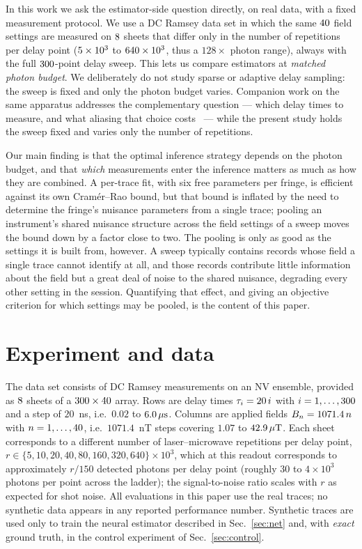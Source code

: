 \documentclass[aps,pra,twocolumn,superscriptaddress,nofootinbib]{revtex4-2}
\newcommand{\mus}{\,\mu\mathrm{s}}
\newcommand{\muT}{\,\mu\mathrm{T}}
\begin{document}
In this work we ask the estimator-side question directly, on real data, with a fixed
measurement protocol. We use a DC Ramsey data set in which the same $40$ field
settings are measured on $8$ sheets that differ only in the number of repetitions
per delay point ($5\times10^{3}$ to $640\times10^{3}$, thus a $128\times$ photon
range), always with the full $300$-point delay sweep. This lets us compare estimators at
\emph{matched photon budget}. We deliberately do not study sparse or adaptive delay
sampling: the sweep is fixed and only the photon budget varies. Companion work on the same
apparatus addresses the complementary question --- which delay times to measure, and what
aliasing that choice costs~\cite{L3companion,L4companion} --- while the present study holds
the sweep fixed and varies only the number of repetitions.

Our main finding is that the optimal inference strategy depends on the photon budget, and
that \emph{which} measurements enter the inference matters as much as how they are combined.
A per-trace fit, with six free parameters per fringe, is efficient against its own
Cram\'er--Rao bound, but that bound is inflated by the need to determine the fringe's
nuisance parameters from a single trace; pooling an instrument's shared nuisance structure
across the field settings of a sweep moves the bound down by a factor close to two. The
pooling is only as good as the settings it is built from, however. A sweep typically
contains records whose field a single trace cannot identify at all, and those records
contribute little information about the field but a great deal of noise to the shared
nuisance, degrading every other setting in the session. Quantifying that effect, and giving
an objective criterion for which settings may be pooled, is the content of this paper.

\section{Experiment and data}

The data set consists of DC Ramsey measurements on an NV ensemble, provided as $8$
sheets of a $300\times40$ array. Rows are delay times $\tau_i = 20\,i$ with
$i=1,\dots,300$ and a step of $20$~ns, i.e.\ $0.02$ to $\tauMax\mus$. Columns are applied
fields $B_n = 1071.4\,n$ with $n=1,\dots,40$, i.e.\ $1071.4$~nT steps covering $1.07$ to
$\bMax\muT$. Each sheet corresponds to a different number of laser--microwave repetitions
per delay point, $r\in\{5,10,20,40,80,160,320,640\}\times10^{3}$, which at this
readout corresponds to approximately $r/150$ detected photons per delay point (roughly
$30$ to $4\times10^{3}$ photons per point across the ladder); the signal-to-noise ratio
scales with $r$ as expected for shot noise. All evaluations in this paper use the real
traces; no synthetic data appears in any reported performance number. Synthetic traces are
used only to train the neural estimator described in Sec.~\ref{sec:net} and, with
\emph{exact} ground truth, in the control experiment of Sec.~\ref{sec:control}.
\end{document}
